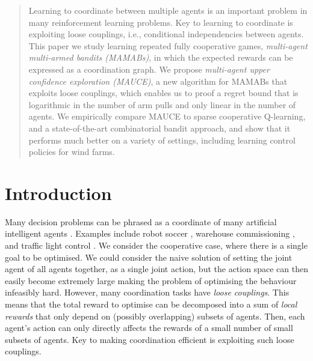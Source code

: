 \documentclass{article}
\begin{document}
\printAffiliationsAndNotice{}  %

\begin{abstract}
Learning to coordinate between multiple agents is an important problem in many reinforcement learning problems. Key to learning to coordinate is exploiting loose couplings, i.e., conditional independencies between agents. This paper we study learning repeated fully cooperative games, \emph{multi-agent multi-armed bandits (MAMABs)}, in which the expected rewards can be expressed as a coordination graph. We propose \emph{multi-agent upper confidence exploration (MAUCE)}, a new algorithm for MAMABs that exploits loose couplings, which enables us to proof a regret bound that is logarithmic in the number of arm pulls and only linear in the number of agents. We empirically compare MAUCE to sparse cooperative Q-learning, and a state-of-the-art combinatorial bandit approach, and show that it performs much better on a variety of settings, including learning control policies for wind farms. 

\end{abstract}

\section{Introduction} 
Many decision problems can be phrased as a coordinate of many artificial intelligent agents \cite{boutilier1996mmdp}. Examples include robot soccer \cite{kok2003multi}, warehouse commissioning \cite{claes2017decentralised}, and traffic light control \cite{wiering2000multi}.  We consider the cooperative case, where there is a single goal to be optimised.  We could consider the naive solution of setting the joint agent of all agents together, as a single joint action, but the action space can then easily become extremely large making the problem of optimising the behaviour infeasibly hard.
%
However, many coordination tasks have \emph{loose couplings}. This means that the total reward to optimise can be decomposed into a sum of \emph{local rewards} that only depend on (possibly overlapping) subsets of agents.  Then, each agent's action can only directly affects the rewards of a small number of small subsets of agents. Key to making coordination efficient is exploiting such loose couplings.
\end{document}
